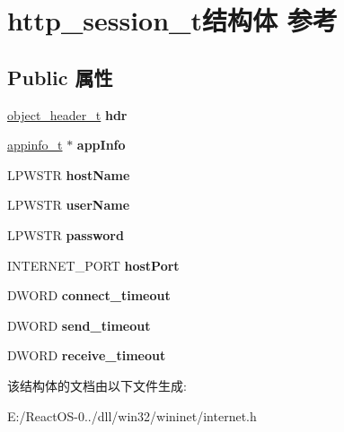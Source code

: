 \hypertarget{structhttp__session__t}{}\section{http\+\_\+session\+\_\+t结构体 参考}
\label{structhttp__session__t}
\subsection*{Public 属性}
\begin{DoxyCompactItemize}
\item 
\mbox{\label{structhttp__session__t_a9cc9f97390afa460929a891e48fb7538}} 
\hyperlink{struct__object__header__t}{object\+\_\+header\+\_\+t} {\bfseries hdr}
\item 
\mbox{\label{structhttp__session__t_a51e22a89f3f2d53e4abfd46fbac93f66}} 
\hyperlink{structappinfo__t}{appinfo\+\_\+t} $\ast$ {\bfseries app\+Info}
\item 
\mbox{\label{structhttp__session__t_accbeab817200b93868fdad2827d2706d}} 
L\+P\+W\+S\+TR {\bfseries host\+Name}
\item 
\mbox{\label{structhttp__session__t_ada467be0c53ee0672453f0da1b2ec041}} 
L\+P\+W\+S\+TR {\bfseries user\+Name}
\item 
\mbox{\label{structhttp__session__t_aa125a6e5e6fdb984978580debb4a2e7b}} 
L\+P\+W\+S\+TR {\bfseries password}
\item 
\mbox{\label{structhttp__session__t_a6cd52384b1cb28320cc8c70c5ae31bb5}} 
I\+N\+T\+E\+R\+N\+E\+T\+\_\+\+P\+O\+RT {\bfseries host\+Port}
\item 
\mbox{\label{structhttp__session__t_a8d44ef5f6799fe2d0b6a6b44d94b3411}} 
D\+W\+O\+RD {\bfseries connect\+\_\+timeout}
\item 
\mbox{\label{structhttp__session__t_ad12d2950aa28fbe9db3313ff18791360}} 
D\+W\+O\+RD {\bfseries send\+\_\+timeout}
\item 
\mbox{\label{structhttp__session__t_a89a77fde34c229a84f92bd3ff7fb08db}} 
D\+W\+O\+RD {\bfseries receive\+\_\+timeout}
\end{DoxyCompactItemize}


该结构体的文档由以下文件生成\+:\begin{DoxyCompactItemize}
\item 
E\+:/\+React\+O\+S-\/0../dll/win32/wininet/internet.\+h\end{DoxyCompactItemize}
